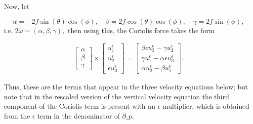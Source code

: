 \documentclass[11pt]{article}
\begin{document}
Now, let

$$\alpha = -2 f \sin(\theta)\cos(\phi), \quad \beta = 2 f \cos(\theta) \cos(\phi), \quad \gamma = 2 f \sin(\phi),$$
%
i.e. $2 \omega = (\alpha, \beta, \gamma),$ then using this, the Coriolis force takes the form

\begin{gather}
\begin{bmatrix} \alpha \\ \beta \\ \gamma \end{bmatrix}
\times
\begin{bmatrix} u_1^\epsilon \\ u_2^\epsilon \\ \epsilon u_3^\epsilon \end{bmatrix}
=
\begin{bmatrix} \beta \epsilon u_3^\epsilon - \gamma u_2^\epsilon \\ \gamma u_1^\epsilon - \alpha \epsilon u_3^\epsilon \\ \alpha u_2^\epsilon - \beta u_1^\epsilon \end{bmatrix}.
\end{gather}

Thus, these are the terms that appear in the three velocity equations below; but note that in the rescaled version of the vertical velocity equation the third component of the Coriolis term is present with an $\epsilon$ multiplier, which is obtained from the $\epsilon$ term in the denominator of $\partial_z p.$
\end{document}
